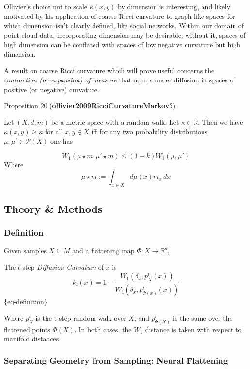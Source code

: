 \documentclass[
]{agujournal2019}
\begin{document}
Ollivier's choice not to scale \(\kappa(x,y)\) by dimension is
interesting, and likely motivated by his application of coarse Ricci
curvature to graph-like spaces for which dimension isn't clearly
defined, like social networks. Within our domain of point-cloud data,
incorporating dimension may be desirable; without it, spaces of high
dimension can be conflated with spaces of low negative curvature but
high dimension.

A result on coarse Ricci curvature which will prove useful concerns the
\emph{contraction (or expansion) of measure} that occurs under diffusion
in spaces of positive (or negative) curvature.

Proposition 20 (\textbf{ollivier2009RicciCurvatureMarkov?})

Let \((X,d,m)\) be a metric space with a random walk. Let
\(\kappa \in \mathbb{R}\). Then we have \(\kappa(x,y) \geq \kappa\) for
all \(x,y \in X\) iff for any two probability distributions
\(\mu, \mu' \in \mathcal{P}(X)\) one has

\[
W_{1}(\mu \star m, \mu' \star m) \leq (1-k)W_{1}(\mu, \mu')
\] Where \[
 \mu \star m := \int_{{x \in X}} d\mu(x)m_{x} \, dx
\]

\subsection{Theory \& Methods}\label{theory-methods}

\subsubsection{Definition}\label{definition}

Given samples \(X \subseteq M\) and a flattening map
\(\Phi: X \rightarrow \mathbb{R}^d\),

The \(t\)-step \emph{Diffusion Curvature} of \(x\) is \[
k_t(x)=1-\frac{W_1\left(\delta_x, p_X^t(x)\right)}{W_1\left(\delta_x, p_{\Phi(x)}^t(x)\right)}
\]\{eq-definition\}

Where \(p_X^t\) is the t-step random walk over \(X\), and
\(p_{\Phi(X)}^t\) is the same over the flattened points \(\Phi(X)\). In
both cases, the \(W_1\) distance is taken with respect to manifold
distances.

\subsubsection{Separating Geometry from Sampling: Neural
Flattening}\label{separating-geometry-from-sampling-neural-flattening}
\end{document}
